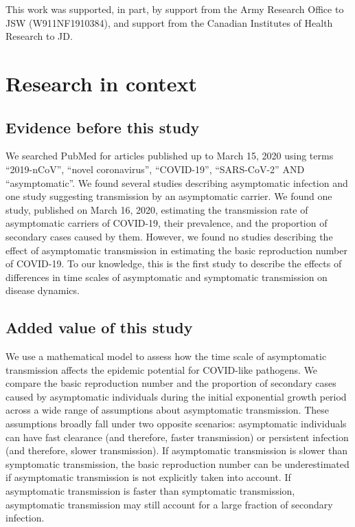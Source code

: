 \documentclass[12pt]{article}
\begin{document}
This work was supported, in part, by support from the Army Research Office to JSW (W911NF1910384), and support from the Canadian Institutes of Health Research to JD.

\pagebreak

\section*{Research in context}

\subsection*{Evidence before this study}

We searched PubMed for articles published up to March 15, 2020 using terms ``2019-nCoV'', ``novel coronavirus'', ``COVID-19'', ``SARS-CoV-2'' AND ``asymptomatic''. We found several studies describing asymptomatic infection and one study suggesting transmission by an asymptomatic carrier. 
We found one study, published on March 16, 2020, estimating the transmission rate of asymptomatic carriers of COVID-19, their prevalence, and the proportion of secondary cases caused by them.
However, we found no studies describing the effect of asymptomatic transmission in estimating the basic reproduction number of COVID-19.
To our knowledge, this is the first study to describe the effects of differences in time scales of asymptomatic and symptomatic transmission on disease dynamics.

\subsection*{Added value of this study}

We use a mathematical model to assess how the time scale of asymptomatic transmission affects the epidemic potential for COVID-like pathogens.
We compare the basic reproduction number and the proportion of secondary cases caused by asymptomatic individuals during the initial exponential growth period across a wide range of assumptions about asymptomatic transmission.
These assumptions broadly fall under two opposite scenarios: asymptomatic individuals can have fast clearance (and therefore, faster transmission) or persistent infection (and therefore, slower transmission).
If asymptomatic transmission is slower than symptomatic transmission, the basic reproduction number can be underestimated if asymptomatic transmission is not explicitly taken into account.
If asymptomatic transmission is faster than symptomatic transmission, asymptomatic transmission may still account for a large fraction of secondary infection.
\end{document}
